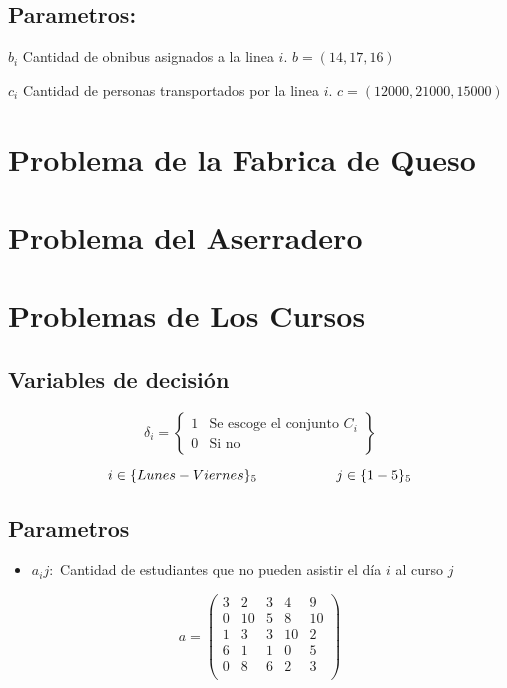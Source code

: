 \documentclass[]{article}
\begin{document}
{\subsection{Parametros:}

$b_i$ Cantidad de obnibus asignados a la linea $i$. $ b = \left(14,17,16\right) $  

$c_i$ Cantidad de personas transportados por la linea $i$. $c =\left(12000,21000, 15000\right)$ 

\section{Problema de la Fabrica de  Queso}

\section{Problema del Aserradero} 



\section{Problemas de Los Cursos} 

\subsection{Variables de decisi\'on}

\begin{equation*}
\delta_{i} = 
 \left\{ \begin{array}{cl}
 1 & \mbox{Se escoge el conjunto $C_i$}\\
 0 & \mbox{Si no}
 \end{array} \right\}
\end{equation*}



$$i \in \{Lunes - Viernes\}_5 \hspace*{2cm } j \in \{1-5\}_5 $$


\subsection{Parametros}

\begin{itemize}
	\item $a_ij : $ Cantidad de estudiantes que no pueden asistir el d\'ia $i$ al curso $j$ 
\end{itemize}


\begin{equation*}
	a = 
	\begin{pmatrix}
		3 & 2 & 3 & 4 & 9 \\
		0 & 10 & 5 & 8 & 10 \\
		1 & 3 & 3 & 10 & 2 \\
		6 & 1 & 1 & 0 & 5 \\
		0 & 8 & 6 & 2 & 3 \\
	\end{pmatrix}
\end{equation*}



}
\end{document}
